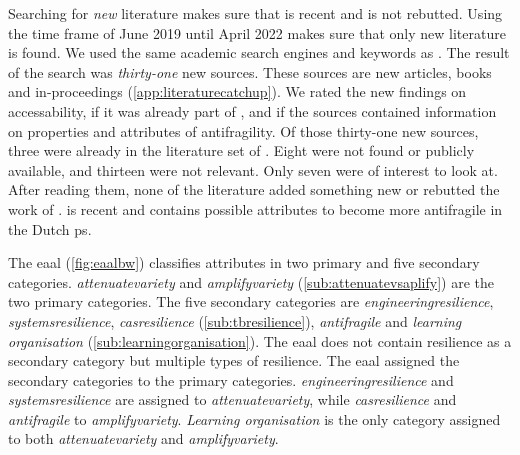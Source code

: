 Searching for \textit{new} literature makes sure that \textcite{Botjes2021} is recent and is not rebutted. Using the time frame of June 2019 until April 2022 makes sure that only new literature is found. We used the same academic search engines and keywords as \textcite[p.~5]{Botjes2021}. The result of the search was \textit{thirty-one} new sources. These sources are new articles, books and in-proceedings (\cref{app:literaturecatchup}). We rated the new findings on accessability, if it was already part of \textcite{Botjes2021}, and if the sources contained information on properties and attributes of \gls{antifragility}. Of those thirty-one new sources, three were already in the literature set of \textcite{Botjes2021}. Eight were not found or publicly available, and thirteen were not relevant. Only seven were of interest to look at. After reading them, none of the literature added something new or rebutted the work of \citeauthor{Botjes2021}. \textcite{Botjes2021} is recent and contains possible \glspl{attribute} to become more \gls{antifragile} in the Dutch \gls{ps}.

The \acrlong{eaal} (\cref{fig:eaalbw}) classifies \glspl{attribute} in two primary and five secondary categories. \textit{\Gls{attenuatevariety}} and \textit{\gls{amplifyvariety}} (\cref{sub:attenuatevsaplify}) are the two primary categories. The five secondary categories are \textit{\gls{engineeringresilience}}, \textit{\gls{systemsresilience}}, \textit{\gls{casresilience}} (\cref{sub:tbresilience}), \textit{\gls{antifragile}} and \textit{learning organisation} (\cref{sub:learningorganisation}). The \acrlong{eaal} does not contain resilience as a secondary category but multiple types of resilience. The \acrlong{eaal} assigned the secondary categories to the primary categories. \textit{\Gls{engineeringresilience}} and \textit{\gls{systemsresilience}} are assigned to \textit{\gls{attenuatevariety}}, while \textit{\gls{casresilience}} and \textit{\gls{antifragile}} to \textit{\gls{amplifyvariety}}. \textit{Learning organisation} is the only category assigned to both \textit{\gls{attenuatevariety}} and \textit{\gls{amplifyvariety}}.
